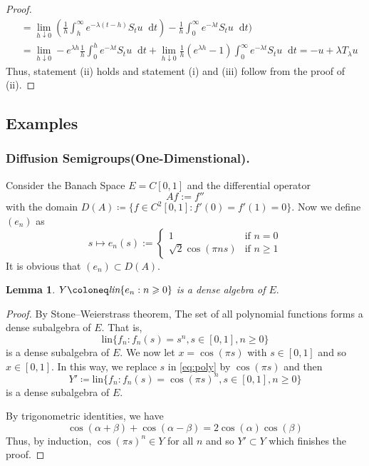 \documentclass[12pt, reqno]{amsart}
\renewcommand{\geq}{\geqslant}
\newcommand{\1}{\mathbbm 1}
\newcommand*\diff{\mathop{}\!\mathrm{d}}
\theoremstyle{plain}
\newtheorem{lemma}[theorem]{Lemma}
\theoremstyle{definition}
\begin{document}
\begin{proof}
\begin{align*}
   &=\lim_{h \downarrow 0}(\frac{1}{h}\int_{h}^{\infty} e^{-\lambda( t-h)}S_{t} u\diff t)-\frac{1}{h}\int_{0}^{\infty} e^{-\lambda t}S_t u\diff t)\\
   &=\lim_{h \downarrow 0}- e^{\lambda h}\frac{1}{h}\int_{0}^{h} e^{-\lambda t}S_t u\diff t+\lim_{h \downarrow 0}\frac{1}{h}(e^{\lambda h}-1)\int_{0}^{\infty} e^{-\lambda t}S_t u\diff t=-u+\lambda T_{\lambda}u
\end{align*}
Thus, statement (ii) holds and statement (i) and (iii) follow from the proof of (ii).
\end{proof}
\subsection{Examples}
\subsubsection{Diffusion Semigroups(One-Dimenstional).} Consider the Banach Space $E=C[0,1]$ and the differential operator 
\begin{equation*}
Af:=f''
\end{equation*}  
with the domain $D(A)\coloneq\{f\in C^2[0,1]:f'(0)=f'(1)=0\}.$ Now we define $(e_n)$ as
\begin{equation*}
s\mapsto e_n(s) :=\begin{cases}1 & \text{if $n =0$} \\
                                                   \sqrt{2} \cos(\pi n s) & \text{if $n\geq 1$}
                             \end{cases}
\end{equation*}
It is obvious that $(e_n)\subset D(A).$
\begin{lemma}
 $Y\coloneq \emph{lin}\{e_n:n\geq0\}$ is a dense algebra of $E.$
\end{lemma}
\begin{proof}
	By Stone–Weierstrass theorem,  The set of all polynomial functions forms a  dense subalgebra of $E$. That is,
	\begin{equation}\label{eq:poly}
	\text{lin}\{f_n: f_n(s)=s^n, s\in[0,1], n\geq0\}
	\end{equation} is a dense subalgebra of $E.$ We now let $x=\cos(\pi s)$ with $s\in[0,1]$ and so $x\in[0,1]$. In this way, we replace $s$ in \eqref{eq:poly} by $\cos(\pi s)$ and then
	\begin{equation*}
	Y'\coloneq\text{lin}\{f_n: f_n(s)=\cos(\pi s)^n, s\in[0,1], n\geq0\}
	\end{equation*} is a dense subalgebra of $E.$ 
	
	By trigonometric identities, we have
	\begin{equation}\label{eq:trigo}
	\cos(\alpha+\beta)+\cos(\alpha-\beta)=2\cos(\alpha)\cos(\beta)
	\end{equation}
	Thus, by induction, $\cos(\pi s)^n\in Y$ for all $n$ and so $ Y'\subset Y$ which finishes the proof.
\end{proof}
\end{document}
